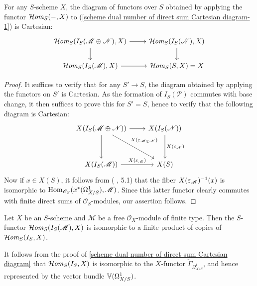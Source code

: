 \begin{proposition}\label{scheme dual number of direct sum Cartesian diagram}
For any $S$-scheme $X$, the diagram of functors over $S$ obtained by applying the functor $\operatorname{\mathcal{H}\hspace*{-0.4pt}\textit{om}\hspace{0.5pt}}_S(-,X)$ to (\ref{scheme dual number of direct sum Cartesian diagram-1}) is Cartesian:
\[\begin{tikzcd}
\sHom_S(I_S(\mathscr{M}\oplus\mathscr{N}),X)\ar[r]\ar[d]&\sHom_S(I_S(\mathscr{N}),X)\ar[d]\\
\sHom_S(I_S(\mathscr{M}),X)\ar[r]&\sHom_S(S,X)=X
\end{tikzcd}\]
\end{proposition}
\begin{proof}
It suffices to verify that for any $S'\to S$, the diagram obtained by applying the functors on $S'$ is Cartesian. As the formation of $I_S(\mathscr{P})$ commutes with base change, it then suffices to prove this for $S'=S$, hence to verify that the following diagram is Cartesian:
\[\begin{tikzcd}[row sep=12mm,column sep=8mm]
X(I_S(\mathscr{M}\oplus\mathscr{N}))\ar[r]\ar[d]\ar[rd,"X(\eps_{\mathscr{M}\oplus\mathscr{N}})",pos=0.4]&X(I_S(\mathscr{N}))\ar[d,"X(\eps_\mathscr{N})"]\\
X(I_S(\mathscr{M}))\ar[r,"X(\eps_\mathscr{M})"]&X(S)
\end{tikzcd}\]
Now if $x\in X(S)$, it follows from (\cite{SGA1} , 5.1) that the fiber $X(\varepsilon_\mathscr{M})^{-1}(x)$ is isomorphic to $\mathrm{Hom}_{\mathscr{O}_S}(x^*(\Omega_{X/S}^1),\mathscr{M})$. Since this latter functor clearly commutes with finite direct sums of $\mathscr{O}_S$-modules, our assertion follows.
\end{proof}

\begin{corollary}\label{scheme dual number isomorphic to product}
Let $X$ be an $S$-scheme and $\mathscr{M}$ be a free $\mathscr{O}_X$-module of finite type. Then the $S$-functor $\operatorname{\mathcal{H}\hspace*{-0.4pt}\textit{om}\hspace{0.5pt}}_S(I_S(\mathscr{M}),X)$ is isomorphic to a finite product of copies of $\operatorname{\mathcal{H}\hspace*{-0.4pt}\textit{om}\hspace{0.5pt}}_S(I_S,X)$.
\end{corollary}

\begin{remark}\label{scheme dual number Hom represented by vector bundle of Omega}
It follows from the proof of \cref{scheme dual number of direct sum Cartesian diagram} that $\operatorname{\mathcal{H}\hspace*{-0.4pt}\textit{om}\hspace{0.5pt}}_S(I_S,X)$ is isomorphic to the $X$-functor $\check{\Gamma}_{\Omega^1_{X/S}}$, and hence represented by the vector bundle $\mathbb{V}(\Omega_{X/S}^1)$. 
\end{remark}

